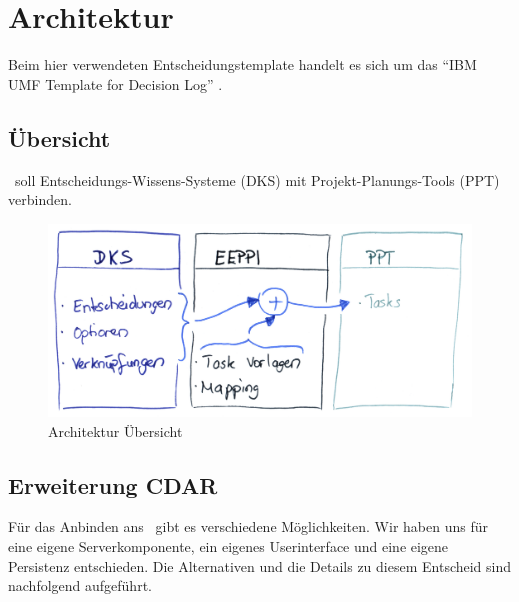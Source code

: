 \chapter{Architektur}
	
	Beim hier verwendeten Entscheidungstemplate handelt es sich um das "`IBM UMF Template for Decision Log"' \cite{hand_ibm_2008}.
	
	\section{Übersicht}
		\eeppi\ soll Entscheidungs-Wissens-Systeme (DKS) mit 
		Projekt-Planungs-Tools (PPT) verbinden.
		
		\begin{figure}[H]
			\includegraphics[width=\textwidth]{architecture/media/img/eeppiSchema.jpg}
			\centering
			\caption{Architektur Übersicht}
			\label{fig:architectureSchema}
		\end{figure}		
	
	
	\section{Erweiterung CDAR}
		Für das Anbinden ans \cdar\ gibt es verschiedene Möglichkeiten.
		Wir haben uns für eine eigene Serverkomponente, ein eigenes Userinterface und eine eigene Persistenz entschieden.
		Die Alternativen und die Details zu diesem Entscheid sind nachfolgend aufgeführt.
		
